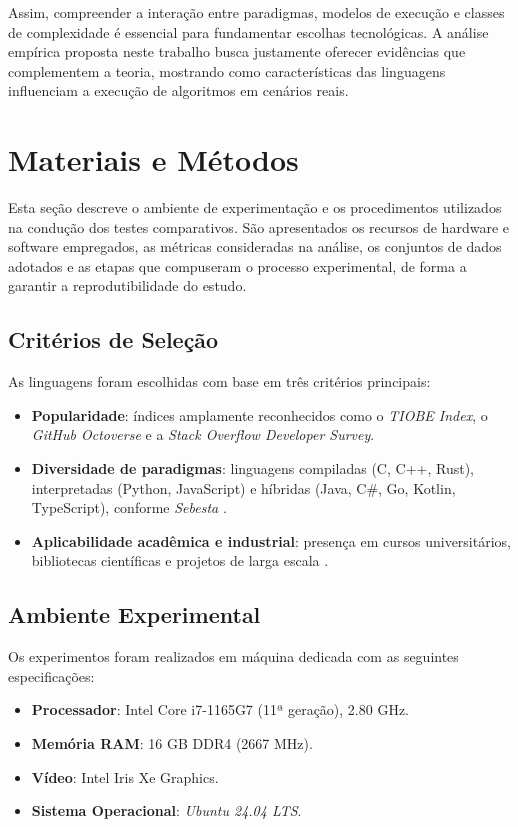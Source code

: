 \documentclass[12pt,a4paper]{article}
\newcommand{\eng}[1]{\textit{#1}}
\begin{document}
Assim, compreender a interação entre paradigmas, modelos de execução e classes de complexidade é essencial para fundamentar escolhas tecnológicas. A análise empírica proposta neste trabalho busca justamente oferecer evidências que complementem a teoria, mostrando como características das linguagens influenciam a execução de algoritmos em cenários reais.

\section{Materiais e Métodos}

Esta seção descreve o ambiente de experimentação e os procedimentos utilizados na condução dos testes comparativos. São apresentados os recursos de hardware e software empregados, as métricas consideradas na análise, os conjuntos de dados adotados e as etapas que compuseram o processo experimental, de forma a garantir a reprodutibilidade do estudo.

\subsection{Critérios de Seleção}
As linguagens foram escolhidas com base em três critérios principais:
\begin{itemize}
  \item \textbf{Popularidade}: índices amplamente reconhecidos como o \eng{TIOBE Index}, o \eng{GitHub Octoverse} e a \eng{Stack Overflow Developer Survey}.
  \item \textbf{Diversidade de paradigmas}: linguagens compiladas (C, C++, Rust), interpretadas (Python, JavaScript) e híbridas (Java, C\#, Go, Kotlin, TypeScript), conforme \eng{Sebesta} .
  \item \textbf{Aplicabilidade acadêmica e industrial}: presença em cursos universitários, bibliotecas científicas e projetos de larga escala \cite{pressman2016}.
\end{itemize}

\subsection{Ambiente Experimental}
Os experimentos foram realizados em máquina dedicada com as seguintes especificações:
\begin{itemize}
  \item \textbf{Processador}: Intel Core i7-1165G7 (11ª geração), 2.80 GHz.
  \item \textbf{Memória RAM}: 16 GB DDR4 (2667 MHz).
  \item \textbf{Vídeo}: Intel Iris Xe Graphics.
  \item \textbf{Sistema Operacional}: \eng{Ubuntu 24.04 LTS}.
\end{itemize}
\end{document}
